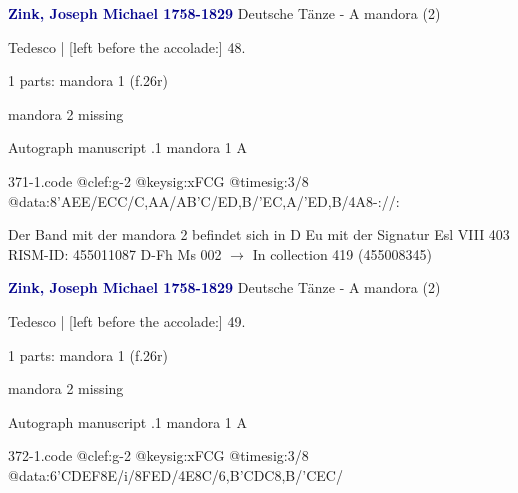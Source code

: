 \documentclass[twocolumn]{book}
\begin{document}
\newline \par \vspace{7pt} \textcolor{darkblue}{\textbf{Zink, Joseph Michael  1758-1829}}
\newline Deutsche Tänze - A
\newline mandora (2)
\newline \begin{itshape}[f.26r, at left:] Tedesco | [left before the accolade:] 48.\end{itshape} 
\newline \textcolor{darkblue}{}  1 parts: mandora 1  (f.26r)
\newline \begin{small} mandora 2 missing\end{small} 
\newline Autograph manuscript
.1  mandora 1  A  
\begin{filecontents*}{371-1.code}
@clef:g-2
@keysig:xFCG
@timesig:3/8
@data:{8'AEE}/{ECC}/{C,AA}/{AB'C}/{ED,B}/{'EC,A}/{'ED,B}/4A8-://:
\end{filecontents*}
\newline
%

\newline Der Band mit der mandora 2 befindet sich in D Eu mit der Signatur Esl VIII 403
\newline RISM-ID: 455011087
\newline D-Fh  Ms 002
\newline $\rightarrow$ In collection 419 (455008345)
      
\newline \par \vspace{7pt} \textcolor{darkblue}{\textbf{Zink, Joseph Michael  1758-1829}}
\newline Deutsche Tänze - A
\newline mandora (2)
\newline \begin{itshape}[f.26r, at left:] Tedesco | [left before the accolade:] 49.\end{itshape} 
\newline \textcolor{darkblue}{}  1 parts: mandora 1  (f.26r)
\newline \begin{small} mandora 2 missing\end{small} 
\newline Autograph manuscript
.1  mandora 1  A  
\begin{filecontents*}{372-1.code}
@clef:g-2
@keysig:xFCG
@timesig:3/8
@data:{6'CDEF}8E/i/8FED/4E8C/{6,B'CDC}8,B/'CEC/
\end{filecontents*}
\newline
%
\end{document}
